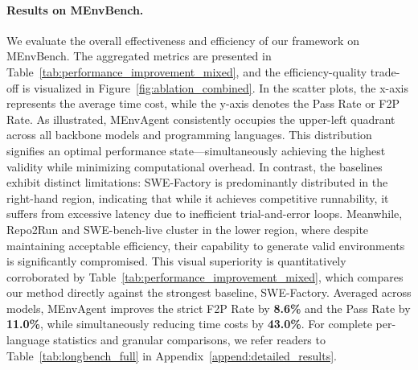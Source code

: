 \documentclass{article}
\theoremstyle{plain}
\theoremstyle{definition}
\theoremstyle{remark}
\begin{document}
\paragraph{Results on MEnvBench.}
We evaluate the overall effectiveness and efficiency of our framework on MEnvBench. The aggregated metrics are presented in Table~\ref{tab:performance_improvement_mixed}, and the efficiency-quality trade-off is visualized in Figure~\ref{fig:ablation_combined}. 
In the scatter plots, the x-axis represents the average time cost, while the y-axis denotes the Pass Rate or F2P Rate. As illustrated, MEnvAgent consistently occupies the upper-left quadrant across all backbone models and programming languages. 
This distribution signifies an optimal performance state—simultaneously achieving the highest validity while minimizing computational overhead. 
In contrast, the baselines exhibit distinct limitations: SWE-Factory is predominantly distributed in the right-hand region, indicating that while it achieves competitive runnability, it suffers from excessive latency due to inefficient trial-and-error loops. 
Meanwhile, Repo2Run and SWE-bench-live cluster in the lower region, where despite maintaining acceptable efficiency, their capability to generate valid environments is significantly compromised. This visual superiority is quantitatively corroborated by Table~\ref{tab:performance_improvement_mixed}, which compares our method directly against the strongest baseline, SWE-Factory. 
Averaged across models, MEnvAgent improves the strict F2P Rate by \textbf{8.6\%} and the Pass Rate by \textbf{11.0\%}, while simultaneously reducing time costs by \textbf{43.0\%}. 
For complete per-language statistics and granular comparisons, we refer readers to Table~\ref{tab:longbench_full} in Appendix~\ref{append:detailed_results}.





\end{document}
